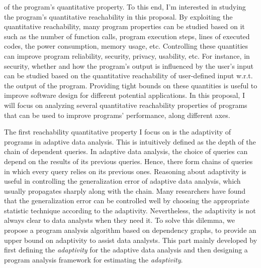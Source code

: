 of the program's quantitative property. 
To this end, I'm interested in studying the program's quantitative reachability in this proposal. 
By exploiting the quantitative reachability,
many program properties can be 
studied based on it
such as the number of function calls,
program execution steps,
lines of executed codes,
the power consumption, memory usage, etc. 
Controlling these quantities can improve program reliability, security, privacy, usability, etc.
 For instance, in security, whether and how the program's output is influenced by the user's input
 can be studied based on the 
 quantitative reachability
 of user-defined input w.r.t. the output of the program.
Providing tight bounds on these quantities is useful to improve software design for different potential applications. In this proposal, I will focus on analyzing several quantitative reachability properties of programs that can be used to improve programs' performance, along different axes.

The first reachability quantitative property
 I focus on is the adaptivity of programs in adaptive data analysis.
 This is intuitively defined as the depth of the chain of dependent queries. 
 In adaptive data analysis, the choice of queries can depend on the results of its previous queries. 
 Hence, there form chains of queries in which every query relies on its previous ones.
 Reasoning about adaptivity is useful in controlling the generalization error of adaptive data analysis, which usually propagates sharply along with the chain. 
 Many researchers have found that the generalization error can be controlled well by choosing the appropriate statistic technique according to the adaptivity. Nevertheless, the adaptivity is not always clear to data analysts when they need it. To solve this dilemma, we propose a program analysis algorithm based on dependency graphs, to provide an upper bound on adaptivity to assist data analysts.
This part mainly developed by first defining the \emph{adaptivity} for 
 the adaptive data analysis
 and then designing
 a program analysis framework for estimating the \emph{adaptivity}.


